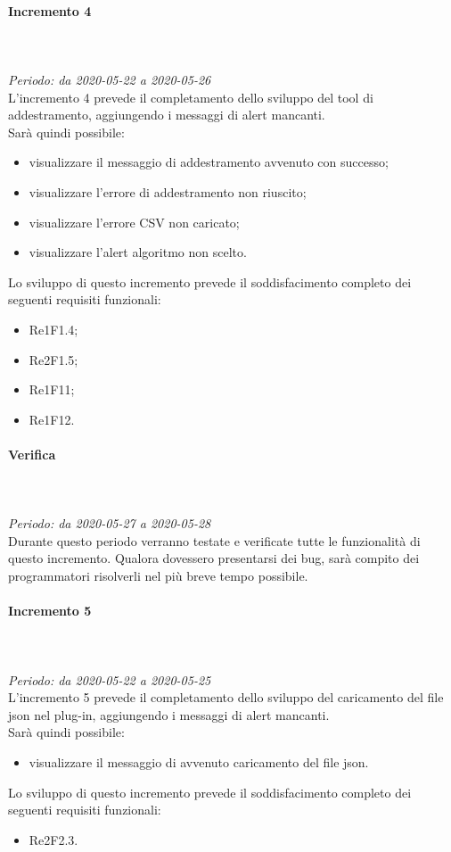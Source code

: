 \paragraph{Incremento 4}\mbox{} \\ \mbox{} \\ 
\textit{Periodo: da 2020-05-22 a 2020-05-26}\\
L’incremento 4 prevede il completamento dello sviluppo del tool di addestramento, aggiungendo i messaggi di alert mancanti.\\
Sarà quindi possibile:
\begin{itemize}
	\item visualizzare il messaggio di addestramento avvenuto con successo;
	\item visualizzare l'errore di addestramento non riuscito;
	\item visualizzare l'errore CSV non caricato;
	\item visualizzare l'alert algoritmo non scelto. 
\end{itemize}
Lo sviluppo di questo incremento prevede il soddisfacimento completo dei seguenti requisiti funzionali:
\begin{itemize}
\item Re1F1.4;
\item Re2F1.5;
\item Re1F11;
\item Re1F12.
\end{itemize}
\paragraph*{Verifica}\mbox{} \\ \mbox{} \\ 
\textit{Periodo: da 2020-05-27 a 2020-05-28}\\
Durante questo periodo verranno testate e verificate tutte le funzionalità di questo incremento. Qualora dovessero presentarsi dei bug, sarà compito dei programmatori risolverli nel più breve tempo possibile.

\paragraph{Incremento 5}\mbox{} \\ \mbox{} \\ 
\textit{Periodo: da 2020-05-22 a 2020-05-25}\\
L’incremento 5 prevede il completamento dello sviluppo del caricamento del file json nel plug-in, aggiungendo i messaggi di alert mancanti.\\
Sarà quindi possibile:
\begin{itemize}
	\item visualizzare il messaggio di avvenuto caricamento del file json.
\end{itemize}
Lo sviluppo di questo incremento prevede il soddisfacimento completo dei seguenti requisiti funzionali:
\begin{itemize}
\item Re2F2.3.
\end{itemize}
